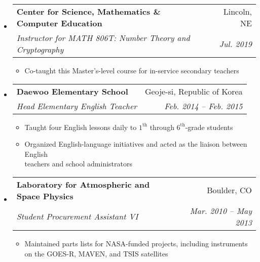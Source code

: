 \documentclass[letterpaper,11pt]{article}
\makeatletter
\newcommand{\resitem}[1]{\item #1 \vspace{-2pt}}
\newcommand{\ressubheading}[4]{
\begin{tabular*}{6.5in}{l@{\extracolsep{\fill}}r}
		\textbf{#1} & #2 \\
		\textit{#3} & \textit{#4} \\
\end{tabular*}\vspace{-6pt}}
\makeatother
\begin{document}
\begin{itemize}
        \item
			\ressubheading{Center for Science, Mathematics \& Computer Education}{Lincoln, NE}{Instructor for MATH 806T: Number Theory and Cryptography}{Jul. 2019}
				{\footnotesize
				\begin{itemize}
				    \resitem{Co-taught this Master's-level course for in-service secondary teachers}
				\end{itemize}
				}
		\item 
		\begin{samepage}
			\ressubheading{Daewoo Elementary School}{Geoje-si, Republic of Korea}{Head Elementary English Teacher}{Feb. 2014 -- Feb. 2015}
				{\footnotesize
				\begin{itemize}
				    \resitem{Taught four English lessons daily to $1^{\text{th}}$ through $6^{\text{th}}$-grade students}
				    \resitem{Organized English-language initiatives and acted as the liaison between  English \\ teachers and school administrators}
				\end{itemize}
				}
		\end{samepage}
        		\item
			\ressubheading{Laboratory for Atmospheric and Space Physics}{Boulder, CO}{Student Procurement Assistant VI}{Mar. 2010 -- May 2013}
				{\footnotesize
				\begin{itemize}
				    \resitem{Maintained parts lists for NASA-funded projects, including instruments \\on the GOES-R, MAVEN, and TSIS satellites}

\end{itemize}}
\end{itemize}
\end{document}
